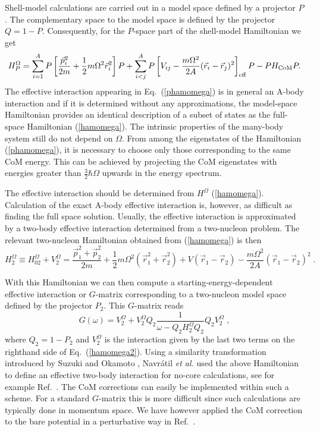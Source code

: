 \documentclass{article}
\begin{document}
% 
Shell-model calculations are carried out in a model space defined
by a projector $P$. 
The complementary space to the model space
is defined by the projector $Q=1-P$. Consequently, for the $P$-space
part of the shell-model Hamiltonian we get
%
\begin{equation}\label{phamomega}
H^\Omega_P=\sum_{i=1}^A P\left[ \frac{\vec{p}_i^2}{2m}
+\frac{1}{2}m\Omega^2 \vec{r}^2_i
\right]P + \sum_{i<j}^A P\left[ V_{ij}-\frac{m\Omega^2}{2A}
(\vec{r}_i-\vec{r}_j)^2
\right]_{\rm eff} P -PH_{\mathrm{CoM}}P.
\end{equation}
%
The effective interaction appearing in Eq.~(\ref{phamomega}) is in general
an A-body interaction and if it is determined without any approximations,
the model-space Hamiltonian provides an identical description 
of a subset of states as the full-space Hamiltonian (\ref{hamomega}).
The intrinsic properties of the many-body system still do not depend
on $\Omega$. From among the eigenstates of the Hamiltonian 
(\ref{phamomega}),
it is necessary to choose only those corresponding to the same 
CoM energy. This can be achieved by projecting 
the CoM eigenstates
with energies greater than $\frac{3}{2}\hbar\Omega$ upwards in the
energy spectrum. 


The effective interaction should be determined from $H^\Omega$ 
(\ref{hamomega}). Calculation of the exact A-body effective
interaction is, however, as difficult as finding the full space solution.
Usually, the effective interaction is approximated by a 
two-body effective interaction determined from a two-nucleon
problem. The relevant two-nucleon Hamiltonian 
obtained from (\ref{hamomega}) is then
%
\begin{equation}\label{hamomega2}
H^\Omega_2\equiv H^\Omega_{02}+V_2^\Omega=
\frac{\vec{p}_1^2+\vec{p}_2^2}{2m}
+\frac{1}{2}m\Omega^2 (\vec{r}^2_1+\vec{r}^2_2)
+ V(\vec{r}_1-\vec{r}_2)-\frac{m\Omega^2}{2A}(\vec{r}_1-\vec{r}_2)^2 \; .
\end{equation}
%

With this Hamiltonian we can then compute a
starting-energy-dependent effective interaction 
or $G$-matrix corresponding to a two-nucleon model
space defined by the projector $P_2$. This $G$-matrix reads
%
\begin{equation}\label{G}
G(\omega) = V_2^\Omega 
+ V_2^\Omega Q_2 \frac{1}{\omega-Q_2H_2^\Omega Q_2} 
Q_2 V_2^\Omega \; ,
\end{equation}
%  
where $Q_2=1-P_2$ and $V_2^\Omega$ is the interaction given by the last 
two terms on the righthand side of Eq.~(\ref{hamomega2}).
Using a similarity transformation introduced by Suzuki and Okamoto \cite{so95},
Navr\'atil {\em et al.} used the above Hamiltonian to define an effective two-body
interaction for no-core calculations, see for example Ref.~\cite{petr_erich2002}. 
The CoM corrections can easily be implemented within such a scheme.
For a standard $G$-matrix this is more difficult since such calculations are typically
done in momentum space. We have however applied the CoM correction to the 
bare potential in a perturbative way in Ref.~\cite{dean03}. 
\end{document}
